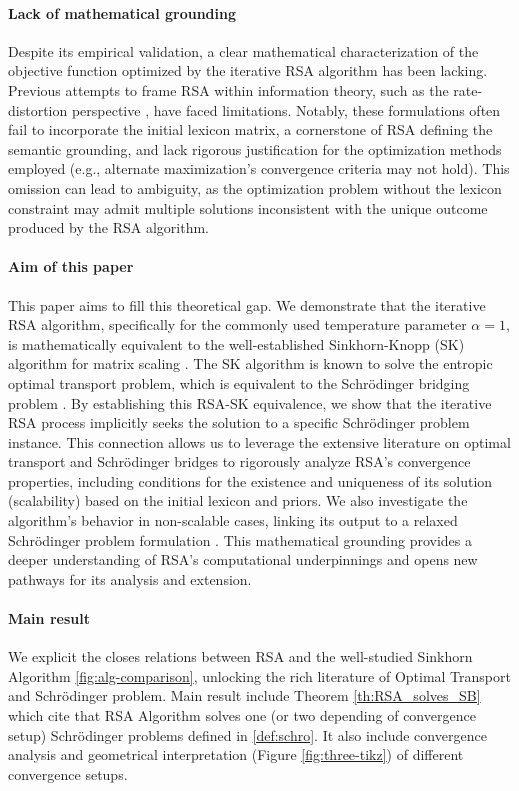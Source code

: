 \documentclass{article}
\begin{document}
\paragraph{Lack of mathematical grounding} Despite its empirical validation, a clear mathematical characterization of the objective function optimized by the iterative RSA algorithm has been lacking. Previous attempts to frame RSA within information theory, such as the rate-distortion perspective \cite{zaslavsky_rate-distortion_2020}, have faced limitations. Notably, these formulations often fail to incorporate the initial lexicon matrix, a cornerstone of RSA defining the semantic grounding, and lack rigorous justification for the optimization methods employed (e.g., alternate maximization's convergence criteria \cite{Csiszar_1984} may not hold). This omission can lead to ambiguity, as the optimization problem without the lexicon constraint may admit multiple solutions inconsistent with the unique outcome produced by the RSA algorithm.

\paragraph{Aim of this paper} This paper aims to fill this theoretical gap. We demonstrate that the iterative RSA algorithm, specifically for the commonly used temperature parameter $\alpha=1$, is mathematically equivalent to the well-established Sinkhorn-Knopp (SK) algorithm for matrix scaling \cite{Sinkhorn1967DiagonalET}. The SK algorithm is known to solve the entropic optimal transport problem, which is equivalent to the Schrödinger bridging problem \cite{léonard2013surveyschrodingerproblemconnections}. By establishing this RSA-SK equivalence, we show that the iterative RSA process implicitly seeks the solution to a specific Schrödinger problem instance. This connection allows us to leverage the extensive literature on optimal transport and Schrödinger bridges to rigorously analyze RSA's convergence properties, including conditions for the existence and uniqueness of its solution (scalability) based on the initial lexicon and priors. We also investigate the algorithm's behavior in non-scalable cases, linking its output to a relaxed Schrödinger problem formulation \cite{baradat2023convergencesinkhornalgorithmschrodinger}. This mathematical grounding provides a deeper understanding of RSA's computational underpinnings and opens new pathways for its analysis and extension.

\paragraph{Main result} We explicit the closes relations between RSA and the well-studied Sinkhorn Algorithm \ref{fig:alg-comparison}, unlocking the rich literature of Optimal Transport and Schrödinger problem. Main result include Theorem \ref{th:RSA_solves_SB} which cite that RSA Algorithm solves one (or two depending of convergence setup) Schrödinger problems defined in \ref{def:schro}. It also include convergence analysis and geometrical interpretation (Figure \ref{fig:three-tikz}) of different convergence setups. 
\end{document}
